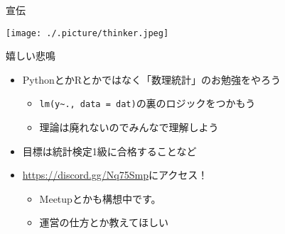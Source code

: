 \documentclass[ignorenonframetext,]{beamer}
\providecommand{\tightlist}{%
  \setlength{\itemsep}{0pt}\setlength{\parskip}{0pt}}
\begin{document}
\begin{frame}{宣伝}
\protect\hypertarget{-1}{}

\texttt{[image: ./.picture/thinker.jpeg]}

\end{frame}

\begin{frame}[fragile]{嬉しい悲鳴}

\begin{itemize}
\tightlist
\item
  PythonとかRとかではなく「数理統計」のお勉強をやろう

  \begin{itemize}
  \tightlist
  \item
    \texttt{lm(y\textasciitilde{}.,\ data\ =\ dat)}の裏のロジックをつかもう
  \item
    理論は廃れないのでみんなで理解しよう
  \end{itemize}
\item
  目標は統計検定1級に合格することなど
\item
  \url{https://discord.gg/Nq75Smp}にアクセス！

  \begin{itemize}
  \tightlist
  \item
    Meetupとかも構想中です。
  \item
    運営の仕方とか教えてほしい
  \end{itemize}
\end{itemize}

\end{frame}
\end{document}
